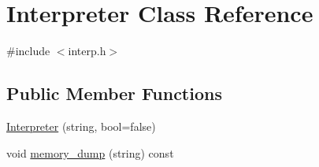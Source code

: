 \hypertarget{classInterpreter}{
\section{Interpreter Class Reference}
\label{classInterpreter}
}


{\ttfamily \#include $<$interp.h$>$}

\subsection*{Public Member Functions}
\begin{DoxyCompactItemize}
\item 
\hyperlink{classInterpreter_a053aca9ec82a7f02879c5216cad78708}{Interpreter} (string, bool=false)
\item 
void \hyperlink{classInterpreter_aadc741cd76c43b3dda9d6c0841ba6548}{memory\_\-dump} (string) const 
\end{DoxyCompactItemize}
